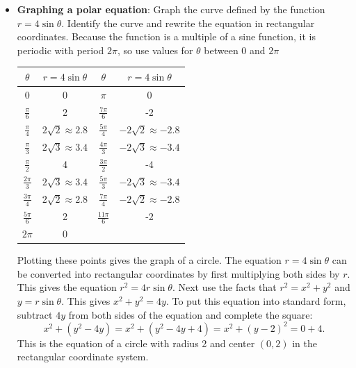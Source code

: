 \documentclass{report}
\begin{document}
\begin{itemize}
    \item \textbf{Graphing a polar equation}: Graph the curve defined by the function $r=4\sin{\theta}$. Identify the curve and rewrite the equation in rectangular coordinates.
        \bigbreak \noindent 
            Because the function is a multiple of a sine function, it is periodic with period  $2\pi$, so use values for $\theta$ between 0 and  $2\pi$
    \bigbreak \noindent 
    \begin{center}
        \begin{tabular}{cc|cc}
            \toprule
            \( \theta \) & \( r = 4\sin\theta \) & \( \theta \) & \( r = 4\sin\theta \) \\
            \midrule
            0 & 0 & \( \pi \) & 0 \\
            \( \frac{\pi}{6} \) & 2 & \( \frac{7\pi}{6} \) & -2 \\
            \( \frac{\pi}{4} \) & \( 2\sqrt{2} \approx 2.8 \) & \( \frac{5\pi}{4} \) & \( -2\sqrt{2} \approx -2.8 \) \\
            \( \frac{\pi}{3} \) & \( 2\sqrt{3} \approx 3.4 \) & \( \frac{4\pi}{3} \) & \( -2\sqrt{3} \approx -3.4 \) \\
            \( \frac{\pi}{2} \) & 4 & \( \frac{3\pi}{2} \) & -4 \\
            \( \frac{2\pi}{3} \) & \( 2\sqrt{3} \approx 3.4 \) & \( \frac{5\pi}{3} \) & \( -2\sqrt{3} \approx -3.4 \) \\
            \( \frac{3\pi}{4} \) & \( 2\sqrt{2} \approx 2.8 \) & \( \frac{7\pi}{4} \) & \( -2\sqrt{2} \approx -2.8 \) \\
            \( \frac{5\pi}{6} \) & 2 & \( \frac{11\pi}{6} \) & -2 \\
            \( 2\pi \) & 0 \\
            \bottomrule
        \end{tabular}
     \end{center}
     \bigbreak \noindent 
     Plotting these points gives the graph of a circle. The equation \( r = 4\sin\theta \) can be converted into rectangular coordinates by first multiplying both sides by \( r \). This gives the equation \( r^2 = 4r\sin\theta \). Next use the facts that \( r^2 = x^2 + y^2 \) and \( y = r\sin\theta \). This gives \( x^2 + y^2 = 4y \). To put this equation into standard form, subtract \( 4y \) from both sides of the equation and complete the square:
     \[
         x^2 + (y^2 - 4y) = x^2 + (y^2 - 4y + 4) = x^2 + (y - 2)^2 = 0 + 4.
     \]
     This is the equation of a circle with radius 2 and center \( (0, 2) \) in the rectangular coordinate system.


\end{itemize}
\end{document}
